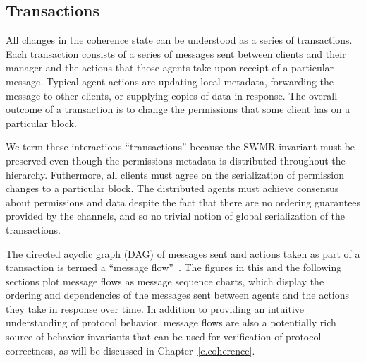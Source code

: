 \subsection{Transactions}

All changes in the coherence state can be understood as a series of transactions.
Each transaction consists of a series of messages sent between clients and their manager
and the actions that those agents take upon receipt of a particular message.
Typical agent actions are updating local metadata, forwarding the message to other clients, or supplying copies of data in response.
The overall outcome of a transaction is to change the permissions that some client has on a particular block.

We term these interactions ``transactions'' because the SWMR invariant must be preserved even though the permissions metadata is distributed throughout the hierarchy.
Futhermore, all clients must agree on the serialization of permission changes to a particular block.
The distributed agents must achieve consensus about permissions and data despite the fact that there are no ordering guarantees
provided by the channels, and so no trivial notion of global serialization of the transactions.

The directed acyclic graph (DAG) of messages sent and actions taken as part of a transaction is termed a ``message flow''~\cite{talupur2008going}.
The figures in this and the following sections plot message flows as message sequence charts,
which display the ordering and dependencies of the messages sent between agents and the actions they take in response over time.
In addition to providing an intuitive understanding of protocol behavior, message flows are also a potentially
rich source of behavior invariants that can be used for verification of protocol correctness, as will be discussed in Chapter~\ref{c.coherence}.

